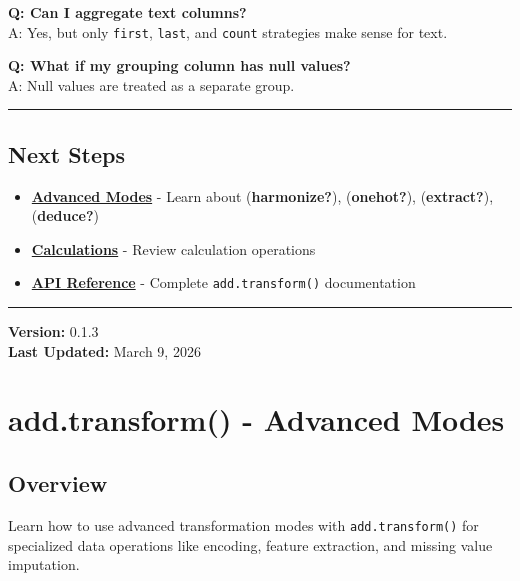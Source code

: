 \documentclass[
  letterpaper,
]{scrbook}
\providecommand{\tightlist}{%
  \setlength{\itemsep}{0pt}\setlength{\parskip}{0pt}}
\begin{document}
\textbf{Q: Can I aggregate text columns?}\\
A: Yes, but only \texttt{\textquotesingle{}first\textquotesingle{}},
\texttt{\textquotesingle{}last\textquotesingle{}}, and
\texttt{\textquotesingle{}count\textquotesingle{}} strategies make sense
for text.

\textbf{Q: What if my grouping column has null values?}\\
A: Null values are treated as a separate group.

\begin{center}\rule{0.5\linewidth}{0.5pt}\end{center}

\section{Next Steps}\label{next-steps-9}

\begin{itemize}
\tightlist
\item
  \textbf{\href{examples-transform-04-advanced-modes.html}{Advanced
  Modes}} - Learn about (\textbf{harmonize?}), (\textbf{onehot?}),
  (\textbf{extract?}), (\textbf{deduce?})
\item
  \textbf{\href{examples-transform-01-calc.html}{Calculations}} - Review
  calculation operations
\item
  \textbf{\href{reference-transform.html}{API Reference}} - Complete
  \texttt{add.transform()} documentation
\end{itemize}

\begin{center}\rule{0.5\linewidth}{0.5pt}\end{center}

\textbf{Version:} 0.1.3\\
\textbf{Last Updated:} March 9, 2026

\chapter{add.transform() - Advanced
Modes}\label{add.transform---advanced-modes}

\section{Overview}\label{overview-8}

Learn how to use advanced transformation modes with
\texttt{add.transform()} for specialized data operations like encoding,
feature extraction, and missing value imputation.
\end{document}
